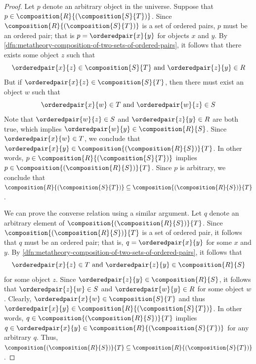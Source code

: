 \begin{proof}
    Let \( p \) denote an arbitrary object in the universe.
    Suppose that \( p \in \composition{R}{\mleft( \composition{S}{T} \mright)} \).
    Since \(  \composition{R}{\mleft( \composition{S}{T} \mright)} \) is a set of ordered pairs,
    \( p \) must be an ordered pair; that is \( p = \orderedpair{x}{y} \) for objects \( x \) and \( y \).
    By \cref{dfn:metatheory-composition-of-two-sets-of-ordered-pairs}, it follows that there exists some object
    \( z \) such that
    \begin{equation*}
        \orderedpair{x}{z} \in \composition{S}{T} \ \text{and} \ \orderedpair{z}{y} \in R
    \end{equation*}
    But if \( \orderedpair{x}{z} \in \composition{S}{T} \), then there must exist an object \( w \) such that
    \begin{equation*}
        \orderedpair{x}{w} \in T \ \text{and} \ \orderedpair{w}{z} \in S
    \end{equation*}
    Note that \( \orderedpair{w}{z} \in S \) and \( \orderedpair{z}{y} \in R \) are both true, which implies
    \( \orderedpair{w}{y} \in \composition{R}{S} \).
    Since \( \orderedpair{x}{w} \in T \), we conclude that
    \( \orderedpair{x}{y} \in \composition{\mleft( \composition{R}{S} \mright)}{T} \).
    In other words, \( p \in  \composition{R}{\mleft( \composition{S}{T} \mright)} \) implies
    \( p \in \composition{\mleft( \composition{R}{S} \mright)}{T} \).
    Since \( p \) is arbitrary, we conclude that \( \composition{R}{\mleft( \composition{S}{T} \mright)} \subseteq  \composition{\mleft( \composition{R}{S} \mright)}{T} \).

    \vspace{0.3cm}
    \noindent
    We can prove the converse relation using a similar argument.
    Let \( q \) denote an arbitrary element of \( \composition{\mleft( \composition{R}{S} \mright)}{T} \).
    Since \( \composition{\mleft( \composition{R}{S} \mright)}{T} \) is a set of ordered pair, it follows that
    \( q \) must be an ordered pair; that is, \( q = \orderedpair{x}{y} \) for some \( x \) and \( y \).
    By \cref{dfn:metatheory-composition-of-two-sets-of-ordered-pairs}, it follows that
    \begin{equation*}
        \orderedpair{x}{z} \in T \ \text{and} \ \orderedpair{z}{y} \in \composition{R}{S}
    \end{equation*}
    for some object \( z \).
    Since \( \orderedpair{z}{y} \in \composition{R}{S} \), it follows that
    \( \orderedpair{z}{w} \in S \) and \( \orderedpair{w}{y} \in R \) for some object \( w \).
    Clearly, \( \orderedpair{x}{w} \in \composition{S}{T} \) and thus \( \orderedpair{x}{y} \in \composition{R}{\mleft( \composition{S}{T} \mright)} \).
    In other words, \( q \in \composition{\mleft( \composition{R}{S} \mright)}{T} \) implies
    \( q \in \orderedpair{x}{y} \in \composition{R}{\mleft( \composition{S}{T} \mright)} \) for any arbitrary \( q \).
    Thus, \( \composition{\mleft( \composition{R}{S} \mright)}{T} \subseteq \composition{R}{\mleft( \composition{S}{T} \mright)} \).


\end{proof}
